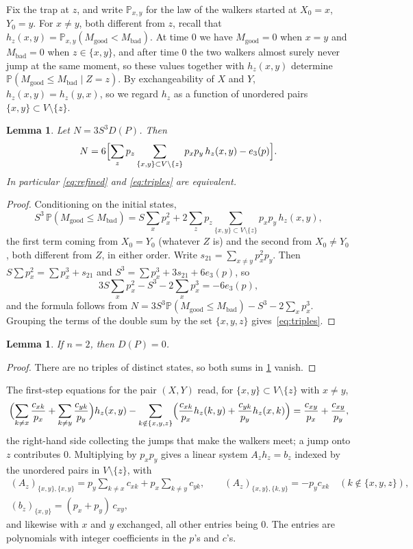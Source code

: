 \documentclass[11pt,a4paper]{article}
\numberwithin{equation}{section}
\newtheorem{lemma}[theorem]{Lemma}
\theoremstyle{remark}
\newcommand{\Pp}{\mathbb P}
\newcommand{\good}{M_{\mathrm{good}}}
\newcommand{\bad}{M_{\mathrm{bad}}}
\begin{document}
Fix the trap at $z$, and write $\Pp_{x,y}$ for the law of the walkers started at $X_0=x$, $Y_0=y$. For $x\ne y$, both different from $z$, recall that $h_z(x,y)=\Pp_{x,y}(\good<\bad)$. At time $0$ we have $\good=0$ when $x=y$ and $\bad=0$ when $z\in\{x,y\}$, and after time $0$ the two walkers almost surely never jump at the same moment, so these values together with $h_z(x,y)$ determine $\Pp(\good\le\bad\mid Z=z)$. By exchangeability of $X$ and $Y$, $h_z(x,y)=h_z(y,x)$, so we regard $h_z$ as a function of unordered pairs $\{x,y\}\subset V\setminus\{z\}$.

\begin{lemma}\label{lem:N}
Let $N=3S^3D(P)$. Then
\[
N=6\Bigl[\sum_{z}p_z\sum_{\{x,y\}\subset V\setminus\{z\}}p_xp_y\,h_z(x,y)-e_3(p)\Bigr].
\]
In particular \eqref{eq:refined} and \eqref{eq:triples} are equivalent.
\end{lemma}

\begin{proof}
Conditioning on the initial states,
\[
S^3\,\Pp(\good\le\bad)=S\sum_xp_x^2+2\sum_zp_z\sum_{\{x,y\}\subset V\setminus\{z\}}p_xp_y\,h_z(x,y),
\]
the first term coming from $X_0=Y_0$ (whatever $Z$ is) and the second from $X_0\ne Y_0$, both different from $Z$, in either order. Write $s_{21}=\sum_{x\ne y}p_x^2p_y$. Then $S\sum p_x^2=\sum p_x^3+s_{21}$ and $S^3=\sum p_x^3+3s_{21}+6e_3(p)$, so
\[
3S\sum_xp_x^2-S^3-2\sum_xp_x^3=-6e_3(p),
\]
and the formula follows from $N=3S^3\Pp(\good\le\bad)-S^3-2\sum_xp_x^3$. Grouping the terms of the double sum by the set $\{x,y,z\}$ gives~\eqref{eq:triples}.
\end{proof}

\begin{lemma}\label{lem:two}
If $n=2$, then $D(P)=0$.
\end{lemma}

\begin{proof}
There are no triples of distinct states, so both sums in \cref{lem:N} vanish.
\end{proof}

The first-step equations for the pair $(X,Y)$ read, for $\{x,y\}\subset V\setminus\{z\}$ with $x\ne y$,
\[
\Bigl(\sum_{k\ne x}\frac{c_{xk}}{p_x}+\sum_{k\ne y}\frac{c_{yk}}{p_y}\Bigr)h_z(x,y)-\sum_{k\notin\{x,y,z\}}\Bigl(\frac{c_{xk}}{p_x}h_z(k,y)+\frac{c_{yk}}{p_y}h_z(x,k)\Bigr)=\frac{c_{xy}}{p_x}+\frac{c_{xy}}{p_y},
\]
the right-hand side collecting the jumps that make the walkers meet; a jump onto $z$ contributes $0$. Multiplying by $p_xp_y$ gives a linear system $A_zh_z=b_z$ indexed by the unordered pairs in $V\setminus\{z\}$, with
\begin{gather*}
(A_z)_{\{x,y\},\{x,y\}}=p_y\sum_{k\ne x}c_{xk}+p_x\sum_{k\ne y}c_{yk},\qquad (A_z)_{\{x,y\},\{k,y\}}=-p_yc_{xk}\quad(k\notin\{x,y,z\}),\\
(b_z)_{\{x,y\}}=(p_x+p_y)\,c_{xy},
\end{gather*}
and likewise with $x$ and $y$ exchanged, all other entries being $0$. The entries are polynomials with integer coefficients in the $p$'s and $c$'s.
\end{document}
